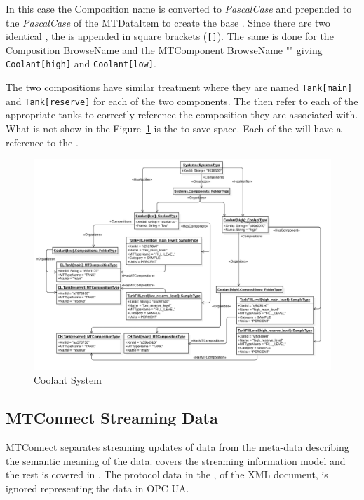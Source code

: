 In this case the \gls{Composition} name is converted to \textit{PascalCase} and prepended to the \textit{PascalCase} of the \gls{MTDataItem} to create the base . Since there are two identical , the  is appended in square brackets (\texttt{[]}). The same is done for the \gls{Composition} \gls{BrowseName} and the \gls{MTComponent} \gls{BrowseName} "" giving \texttt{Coolant[high]} and \texttt{Coolant[low]}.

The two  compositions have similar treatment where they are named \texttt{Tank[main]} and \texttt{Tank[reserve]} for each of the two components. The  then refer to each of the appropriate tanks to correctly reference the composition they are associated with. What is not show in the Figure~\ref{fig:coolant-system} is the  to save space. Each of the  will have a  reference to the .

\begin{figure}[ht]
  \centering
  \includegraphics[width=1.0\textwidth]{diagrams/mtconnect-mapping/coolant-system.png}
  \caption{Coolant System}
  \label{fig:coolant-system}
\end{figure}

\FloatBarrier

\subsection{MTConnect Streaming Data}

MTConnect separates streaming updates of data from the meta-data describing the semantic meaning of the data. \cite{MTCPart3} covers the streaming information model and the \gls{rest}\cite{Fielding2000ArchitecturalArchitectures} is covered in \cite{MTCPart1}. The protocol data in the , of the XML document, is ignored representing the data in OPC UA. 

